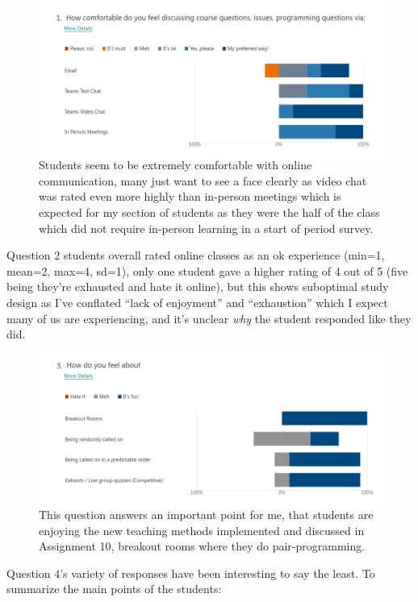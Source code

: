 \documentclass[paper=a4,justified,a4paper]{tufte-handout}
\begin{document}
\begin{figure}
\centering
\includegraphics{./q1.png}
\caption{Students seem to be extremely comfortable with online
communication, many just want to see a face clearly as video chat was
rated even more highly than in-person meetings which is expected for my
section of students as they were the half of the class which did not
require in-person learning in a start of period survey.}
\end{figure}

Question 2 students overall rated online classes as an ok experience
(min=1, mean=2, max=4, sd=1), only one student gave a higher rating of 4
out of 5 (five being they're exhausted and hate it online), but this
shows suboptimal study design as I've conflated ``lack of enjoyment''
and ``exhaustion'' which I expect many of us are experiencing, and it's
unclear \emph{why} the student responded like they did.

\begin{figure}
\centering
\includegraphics{./q3.png}
\caption{This question answers an important point for me, that students
are enjoying the new teaching methods implemented and discussed in
Assignment 10, breakout rooms where they do pair-programming.}
\end{figure}

Question 4's variety of responses have been interesting to say the
least. To summarize the main points of the students:
\end{document}
